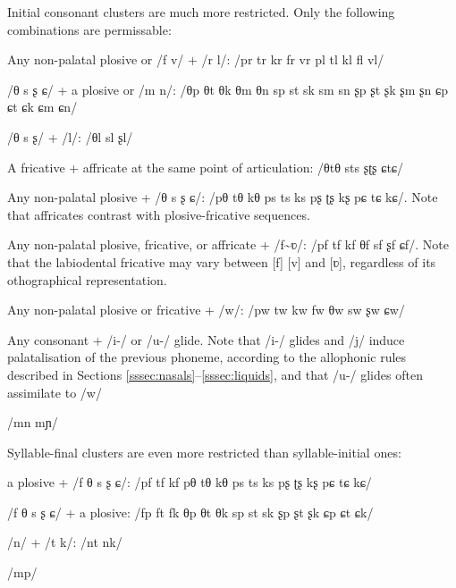 \documentclass[grammar]{subfiles}
\begin{document}

  Initial consonant clusters are much more restricted. Only the following combinations are permissable:

  \begin{itemize*}
  \item Any non-palatal plosive or /f v/ + /r l/: /pr tr kr fr vr pl tl kl fl vl/ 
  \item /θ s ʂ ɕ/ + a plosive or /m n/: /θp θt θk θm θn sp st sk sm sn ʂp ʂt ʂk ʂm ʂn ɕp ɕt ɕk ɕm ɕn/
  \item /θ s ʂ/ + /l/: /θl sl ʂl/
  \item A fricative + affricate at the same point of articulation: /θtθ sts ʂʈʂ ɕtɕ/
  \item Any non-palatal plosive + /θ s ʂ ɕ/: /pθ tθ kθ ps ts ks pʂ ʈʂ kʂ pɕ tɕ kɕ/. Note that affricates contrast with plosive-fricative sequences.
  \item Any non-palatal plosive, fricative, or affricate + /f\textasciitilde ʋ/: /pf tf kf θf sf ʂf ɕf/. Note that the labiodental fricative may vary between [f] [v] and [ʋ], regardless of its othographical representation.
  \item Any non-palatal plosive or fricative + /w/: /pw tw kw fw θw sw ʂw ɕw/
  \item Any consonant + /i-/ or /u-/ glide. Note that /i-/ glides and /j/ induce palatalisation of the previous phoneme, according to the allophonic rules described in Sections \ref{sssec:nasals}–\ref{sssec:liquids}, and that /u-/ glides often assimilate to /w/
  \item /mn mɲ/
  \end{itemize*}

  Syllable-final clusters are even more restricted than syllable-initial ones:

  \begin{itemize*}
  \item a plosive + /f θ s ʂ ɕ/: /pf tf kf pθ tθ kθ ps ts ks pʂ ʈʂ kʂ pɕ tɕ kɕ/
  \item /f θ s ʂ ɕ/ + a plosive: /fp ft fk θp θt θk sp st sk ʂp ʂt ʂk ɕp ɕt ɕk/
  \item /n/ + /t k/: /nt nk/
  \item /mp/
  \end{itemize*}
\end{document}
